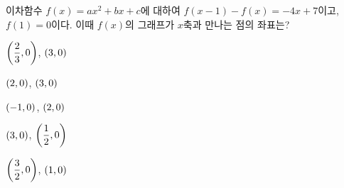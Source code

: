 이차함수 $f(x)=ax^2+bx+c$에 대하여 $f(x-1)-f(x)=-4x+7$이고, $f(1)=0$이다. 이때 $f(x)$의 그래프가 $x$축과 만나는 점의 좌표는? 
\begin{choicesii}{\rule[-3ex]{0pt}{8ex}$\left(\dfrac{2}{3}{,}\mkern3mu 0\right)$, $(3{,}\mkern3mu 0)$}{\rule[-3ex]{0pt}{8ex}$(2{,}\mkern3mu 0)$, $(3{,}\mkern3mu 0)$}{\rule[-3ex]{0pt}{8ex}$(-1{,}\mkern3mu 0)$, $(2{,}\mkern3mu 0)$}{\rule[-3ex]{0pt}{8ex}$(3{,}\mkern3mu 0)$, $\left(\dfrac{1}{2}{,}\mkern3mu 0\right)$}{\rule[-3ex]{0pt}{8ex}$\left(\dfrac{3}{2}{,}\mkern3mu 0\right)$, $(1{,}\mkern3mu 0)$}\end{choicesii}
